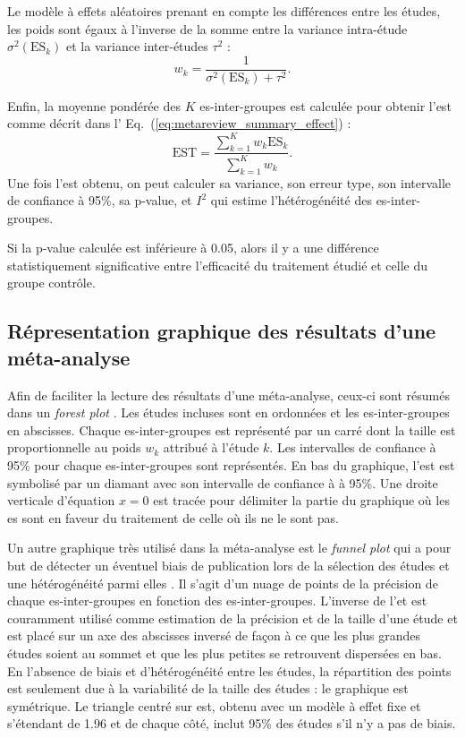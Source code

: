 Le modèle à effets aléatoires prenant en compte les différences entre les études, les poids sont égaux à l'inverse de la somme entre la variance intra-étude
$\sigma^2(\text{ES}_k)$ et la variance inter-études $\tau^2$ \citep{Borenstein2009} :
\begin{equation}
\label{eq:metareview_weight_study}
w_k = \frac{1}{\sigma^2(\text{ES}_k) + \tau^2}.
\end{equation} 

Enfin, la moyenne pondérée des $K$ \gls{es}-inter-groupes est calculée pour obtenir l'\gls{est} comme décrit dans l' 
Eq.~(\ref{eq:metareview_summary_effect}) \citep{Borenstein2009}:
\begin{equation}
\label{eq:metareview_summary_effect}
\text{EST} = \frac{\sum_{k=1}^{K} w_k \text{ES}_k} {\sum_{k=1}^{K} w_k}.
\end{equation} 
Une fois l'\gls{est} obtenu, on peut calculer sa variance, son erreur type, son intervalle de confiance à 95\%, sa p-value, 
et $I^2$ qui estime l'hétérogénéité des \gls{es}-inter-groupes. 

Si la p-value calculée est inférieure à 0.05, alors il y a une différence statistiquement significative entre l'efficacité du traitement étudié 
et celle du groupe contrôle.

\subsection{Répresentation graphique des résultats d'une méta-analyse}

Afin de faciliter la lecture des résultats d'une méta-analyse, ceux-ci sont résumés dans un \textit{forest plot} \citep{Borenstein2009}. Les études incluses sont
en ordonnées et les \gls{es}-inter-groupes en abscisses. Chaque \gls{es}-inter-groupes est représenté par un carré dont la taille est proportionnelle
au poids $w_k$ attribué à l'étude $k$. Les intervalles de confiance à 95\% pour chaque \gls{es}-inter-groupes sont représentés. En bas du graphique, l'\gls{est}
est symbolisé par un diamant avec son intervalle de confiance à à 95\%. Une droite verticale d'équation $x = 0$ est tracée pour délimiter la
partie du graphique où les \gls{es} sont en faveur du traitement de celle où ils ne le sont pas.

Un autre graphique très utilisé dans la méta-analyse est le \textit{funnel plot} qui a pour but de détecter un éventuel biais de publication
lors de la sélection des études et une hétérogénéité parmi elles \citep{Sterne2011}. Il s'agit d'un nuage de points de la précision de chaque 
\gls{es}-inter-groupes en fonction des \gls{es}-inter-groupes. L'inverse de l'\gls{et} est couramment utilisé comme estimation de la précision et de la 
taille d'une étude et est placé sur un axe des abscisses inversé de façon à ce que les plus grandes études soient au sommet et que les plus petites se retrouvent 
dispersées en bas. En l'absence de biais et d'hétérogénéité entre les études, la répartition des points est seulement due à la variabilité de la taille des études : 
le graphique est symétrique. Le triangle centré sur \gls{est}, obtenu avec un modèle à effet fixe et s'étendant de 1.96 \gls{et} de chaque côté, 
inclut 95\% des études s'il n'y a pas de biais.


